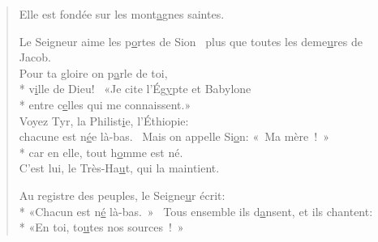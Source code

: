 
\begin{verse}
Elle est fondée sur les mont\underline{a}gnes saintes.~\psalmdagger

Le Seigneur aime les p\underline{o}rtes de Sion~\psalmstar
plus que toutes les deme\underline{u}res de Jacob. \\

Pour ta gloire on p\underline{a}rle de toi, \\*
v\underline{i}lle de Dieu!~\psalmstar
{}«Je cite l’Ég\underline{y}pte et Babylone \\*
entre c\underline{e}lles qui me connaissent.» \\

Voyez Tyr, la Philist\underline{i}e, l’Éthiopie: \\
chacune est n\underline{é}e là-bas.~\psalmstar
{}Mais on appelle Si\underline{o}n: « Ma mère ! » \\*
car en elle, tout h\underline{o}mme est né. \\

C’est lui, le Très-Ha\underline{u}t, qui la maintient.~\psalmdagger

Au registre des peuples, le Seigne\underline{u}r écrit: \\*
«Chacun est n\underline{é} là-bas. »~\psalmstar
{}Tous ensemble ils d\underline{a}nsent, et ils chantent: \\*
«En toi, to\underline{u}tes nos sources ! » \\
\end{verse}

